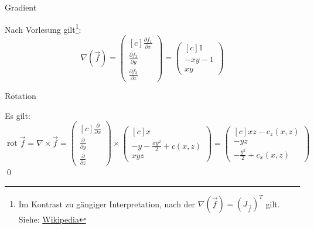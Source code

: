 \documentclass[answers]{exam}
\newcommand{\vektor}[1]{\begin{pmatrix*}[c] #1 \end{pmatrix*}}
\begin{document}
\begin{questions}
\begin{parts}
\begin{subparts}
            \subpart Gradient
            \begin{solution}
                Nach Vorlesung gilt\footnote{Im Kontrast zu gängiger Interpretation, nach der $\nabla(\vec{f}) = (J_{\vec{f}})^T$ gilt. Siehe: \href{https://de.wikipedia.org/wiki/Vektorgradient}{Wikipedia}}:
                $$
                    \nabla (\vec{f}) = \vektor{\frac{\partial f_1}{\partial x} \\ \frac{\partial f_2}{\partial y} \\ \frac{\partial f_3}{\partial z}} = \vektor{1 \\ -xy-1 \\ xy}
                $$
            \end{solution}

            \subpart
            Rotation
            \begin{solution}
                Es gilt:
                $$
                    \operatorname{rot} \vec{f} = \nabla \times \vec{f} = \vektor{\frac{\partial}{\partial x} \\ \frac{\partial}{\partial y} \\ \frac{\partial}{\partial z}} \times \vektor{x \\ -y -\frac{xy^2}{2} + c(x, z) \\ xyz} = \vektor{xz  - c_z(x, z) \\ -yz \\ -\frac{y^2}{2} + c_x(x, z)}
                $$\qed
            \end{solution}
        \end{subparts}
    \end{parts}
\end{questions}
\end{document}
